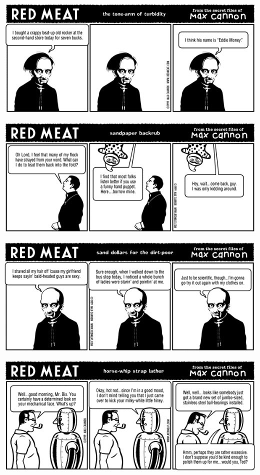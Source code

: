 \documentclass[a4paper,twoside,11pt]{article}
\begin{document}
\includegraphics[width=\textwidth]{redmeat_1999-09-27.png}



\includegraphics[width=\textwidth]{redmeat_1999-10-04.png}



\includegraphics[width=\textwidth]{redmeat_1999-10-11.png}



\includegraphics[width=\textwidth]{redmeat_1999-10-18.png}
\end{document}
